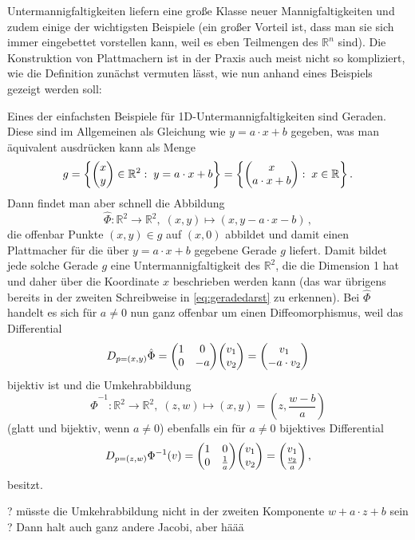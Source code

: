 \documentclass[../H_Analysis_main.tex]{subfiles}
\begin{document}
Untermannigfaltigkeiten liefern eine große Klasse neuer Mannigfaltigkeiten und zudem einige der wichtigsten Beispiele (ein großer Vorteil ist, dass man sie sich immer eingebettet vorstellen kann, weil es eben Teilmengen des $\mathbb{R}^n$ sind). Die Konstruktion von Plattmachern ist in der Praxis auch meist nicht so kompliziert, wie die Definition zunächst vermuten lässt, wie nun anhand eines Beispiels gezeigt werden soll:
\begin{bsp}[Geraden]
Eines der einfachsten Beispiele für 1D-Untermannigfaltigkeiten sind Geraden. Diese sind im Allgemeinen als Gleichung wie $y = a \cdot x + b$ gegeben, was man äquivalent ausdrücken kann als Menge
\begin{equation}\label{eq:geradedarst}
g = \qty{\mqty(x \\ y) \in \mathbb{R}^2: \; y = a \cdot x + b} = \qty{\mqty(x \\ a \cdot x + b): \; x \in \mathbb{R}} \, .
\end{equation}
Dann findet man aber schnell die Abbildung
\begin{equation}
\hat{\Phi}: \mathbb{R}^2 \rightarrow \mathbb{R}^2, \; (x, y) \mapsto (x, y - a \cdot x - b) \, ,
\end{equation}
die offenbar Punkte $(x, y) \in g$ auf $(x, 0)$ abbildet und damit einen Plattmacher für die über $y = a \cdot x + b$ gegebene Gerade $g$ liefert. Damit bildet jede solche Gerade $g$ eine Untermannigfaltigkeit des $\mathbb{R}^2$, die die Dimension 1 hat und daher über die Koordinate $x$ beschrieben werden kann (das war übrigens bereits in der zweiten Schreibweise in \eqref{eq:geradedarst} zu erkennen). Bei $\hat{\Phi}$ handelt es sich für $a \neq 0$ nun ganz offenbar um einen Diffeomorphismus, weil das Differential
\begin{equation}
D_{p = (x, y)} \hat{\Phi} = \mqty(1 & 0 \\ 0 & -a) \mqty(v_1 \\ v_2) = \mqty(v_1 \\ -a \cdot v_2)
\end{equation}
bijektiv ist und die Umkehrabbildung
\begin{equation}
\hat{\Phi}^{-1}: \mathbb{R}^2 \rightarrow \mathbb{R}^2, \; (z, w) \mapsto (x, y) = (z, \frac{w - b}{a})
\end{equation}
(glatt und bijektiv, wenn $a \neq 0$) ebenfalls ein für $a \neq 0$ bijektives Differential
\begin{equation}
D_{p = (z, w)} \Phi^{-1}(v) = \mqty(1 & 0 \\ 0 & \frac{1}{a}) \mqty(v_1 \\ v_2) = \mqty(v_1 \\ \frac{v_2}{a}) \, ,
\end{equation}
besitzt.

? müsste die Umkehrabbildung nicht in der zweiten Komponente $w + a \cdot z + b$ sein ? Dann halt auch ganz andere Jacobi, aber häää

\end{bsp}
\end{document}
